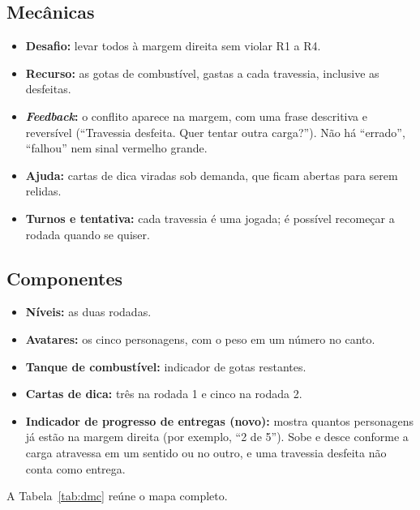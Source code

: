 \documentclass[12pt]{article}
\begin{document}
\subsection{Mecânicas}

\begin{itemize}
  \item \textbf{Desafio:} levar todos à margem direita sem violar R1 a R4.
  \item \textbf{Recurso:} as gotas de combustível, gastas a cada travessia,
        inclusive as desfeitas.
  \item \textbf{\textit{Feedback}:} o conflito aparece na margem, com uma frase
        descritiva e reversível (``Travessia desfeita. Quer tentar outra
        carga?''). Não há ``errado'', ``falhou'' nem sinal vermelho grande.
  \item \textbf{Ajuda:} cartas de dica viradas sob demanda, que ficam abertas
        para serem relidas.
  \item \textbf{Turnos e tentativa:} cada travessia é uma jogada; é possível
        recomeçar a rodada quando se quiser.
\end{itemize}

\subsection{Componentes}

\begin{itemize}
  \item \textbf{Níveis:} as duas rodadas.
  \item \textbf{Avatares:} os cinco personagens, com o peso em um número no canto.
  \item \textbf{Tanque de combustível:} indicador de gotas restantes.
  \item \textbf{Cartas de dica:} três na rodada 1 e cinco na rodada 2.
  \item \textbf{Indicador de progresso de entregas (novo):} mostra quantos
        personagens já estão na margem direita (por exemplo, ``2 de 5''). Sobe
        e desce conforme a carga atravessa em um sentido ou no outro, e uma
        travessia desfeita não conta como entrega.
\end{itemize}

A Tabela~\ref{tab:dmc} reúne o mapa completo.
\end{document}
